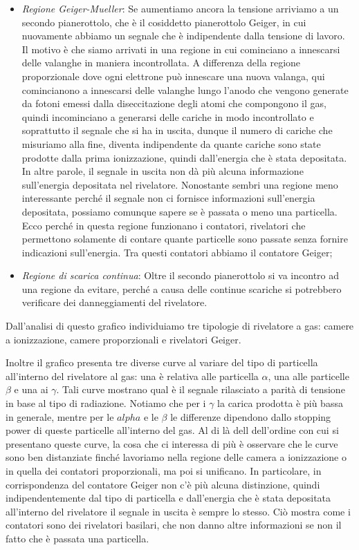 \begin{itemize}[leftmargin=0.5cm]
   \item \textit{Regione Geiger-Mueller}: Se aumentiamo ancora la tensione arriviamo a un secondo pianerottolo, che è il cosiddetto pianerottolo Geiger, in cui nuovamente abbiamo un segnale che è indipendente dalla tensione di lavoro. Il motivo è che siamo arrivati in una regione in cui cominciano a innescarsi delle valanghe in maniera incontrollata. A differenza della regione proporzionale dove ogni elettrone può innescare una nuova valanga, qui comincianono a innescarsi delle valanghe lungo l'anodo che vengono generate da fotoni emessi dalla diseccitazione degli atomi che compongono il gas, quindi incominciano a generarsi delle cariche in modo incontrollato e soprattutto il segnale che si ha in uscita, dunque il numero di cariche che misuriamo alla fine, diventa indipendente da quante cariche sono state prodotte dalla prima ionizzazione, quindi dall'energia che è stata depositata. In altre parole, il segnale in uscita non dà più alcuna informazione sull'energia depositata nel rivelatore. Nonostante sembri una regione meno interessante perché il segnale non ci fornisce informazioni sull'energia depositata, possiamo comunque sapere se è passata o meno una particella. Ecco perché in questa regione funzionano i contatori, rivelatori che permettono solamente di contare quante particelle sono passate senza fornire indicazioni sull'energia. Tra questi contatori abbiamo il contatore Geiger;
   \item \textit{Regione di scarica continua}: Oltre il secondo pianerottolo si va incontro ad una regione da evitare, perché a causa delle continue scariche si potrebbero verificare dei danneggiamenti del rivelatore.
\end{itemize}

Dall'analisi di questo grafico individuiamo tre tipologie di rivelatore a gas: camere a ionizzazione, camere proporzionali e rivelatori Geiger.

Inoltre il grafico presenta tre diverse curve al variare del tipo di particella all'interno del rivelatore al gas: una è relativa alle particella $\alpha$, una alle particelle $\beta$ e una ai $\gamma$. Tali curve mostrano qual è il segnale rilasciato a parità di tensione in base al tipo di radiazione. Notiamo che per i $\gamma$ la carica prodotta è più bassa in generale, mentre per le $alpha$ e le $\beta$ le differenze dipendono dallo stopping power di queste particelle all'interno del gas. Al di là dell dell'ordine con cui si presentano queste curve, la cosa che ci interessa di più è osservare che le curve sono ben distanziate finché lavoriamo nella regione delle camera a ionizzazione o in quella dei contatori proporzionali, ma poi si unificano. In particolare, in corrispondenza del contatore Geiger non c'è più alcuna distinzione, quindi indipendentemente dal tipo di particella e dall'energia che è stata depositata all'interno del rivelatore il segnale in uscita è sempre lo stesso. Ciò mostra come i contatori sono dei rivelatori basilari, che non danno altre informazioni se non il fatto che è passata una particella.

